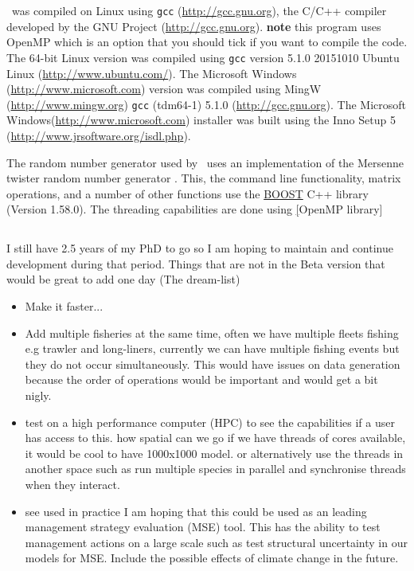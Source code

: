 \IBM\ was compiled on Linux using \texttt{gcc} (\url{http://gcc.gnu.org}), the C/C++ compiler developed by the GNU Project (\url{http://gcc.gnu.org}). \textbf{note} this program uses OpenMP which is an option that you should tick if you want to compile the code. The 64-bit Linux  version was compiled using \texttt{gcc} version 5.1.0 20151010 Ubuntu Linux (\url{http://www.ubuntu.com/}). The Microsoft Windows (\url{http://www.microsoft.com}) version was compiled using MingW (\url{http://www.mingw.org}) \texttt{gcc} (tdm64-1) 5.1.0 (\url{http://gcc.gnu.org}). The Microsoft Windows(\url{http://www.microsoft.com}) installer was built using the Inno Setup 5 (\url{http://www.jrsoftware.org/isdl.php}).

The random number generator used by \IBM\ uses an implementation of the Mersenne twister random number generator \citep{796}. This, the command line functionality, matrix operations, and a number of other functions use the \href{http://www.boost.org/}{BOOST} C++ library (Version 1.58.0). The threading capabilities are done using \href{https://www.openmp.org/}[OpenMP library]


\subsection{}
I still have 2.5 years of my PhD to go so I am hoping to maintain and continue development during that period. Things that are not in the Beta version that would be great to add one day (The dream-list)

\begin{itemize}
	\item Make it faster...
	\item Add multiple fisheries at the same time, often we have multiple fleets fishing e.g trawler and long-liners, currently we can have multiple fishing events but they do not occur simultaneously. This would have issues on data generation because the order of operations would be important and would get a bit nigly.
	\item test on a high performance computer (HPC) to see the capabilities if a user has access to this. how spatial can we go if we have threads of cores available, it would be cool to have 1000x1000 model. or alternatively use the threads in another space such as run multiple species in parallel and synchronise threads when they interact.	
	\item see used in practice I am hoping that this could be used as an leading management strategy evaluation (MSE) tool. This has the ability to test management actions on a large scale such as test structural uncertainty in our models for MSE. Include the possible effects of climate change in the future.
\end{itemize}



